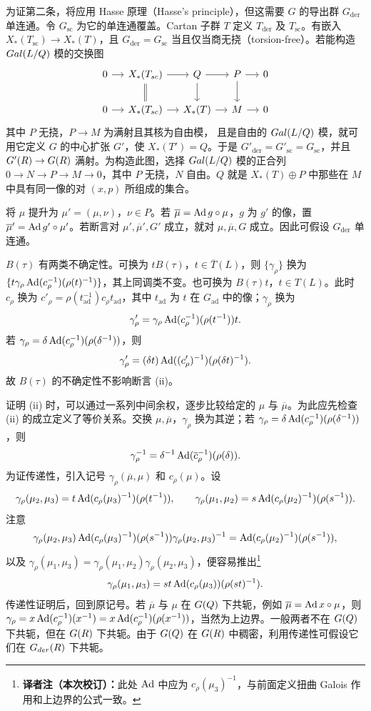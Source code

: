 为证第二条，将应用 Hasse 原理（Hasse's principle），但这需要 $G$ 的导出群
$G_{\mathrm{der}}$ 单连通。令 $G_{\mathrm{sc}}$ 为它的单连通覆盖。Cartan 子群 $T$ 定义
$T_{\mathrm{der}}$ 及 $T_{\mathrm{sc}}$。有嵌入
$X_*(T_{\mathrm{sc}})\to X_*(T)$，且
$G_{\mathrm{der}}=G_{\mathrm{sc}}$ 当且仅当商无挠（torsion-free）。若能构造
$Gal(L/Q)$ 模的交换图
\[
\begin{tikzcd}[column sep=small]
0\arrow[r]&X_*(T_{\mathrm{sc}})\arrow[r]\arrow[d,equal]&Q\arrow[r]\arrow[d]&P\arrow[r]\arrow[d]&0\\
0\arrow[r]&X_*(T_{\mathrm{sc}})\arrow[r]&X_*(T)\arrow[r]&M\arrow[r]&0
\end{tikzcd}
\]
其中 $P$ 无挠，$P\to M$ 为满射且其核为自由模，
且是自由的 $Gal(L/Q)$ 模，就可用它定义 $G$ 的中心扩张 $G'$，使
$X_*(T')=Q$。于是 $G'_{\mathrm{der}}=G'_{\mathrm{sc}}=G_{\mathrm{sc}}$，并且
$G'(R)\to G(R)$ 满射。为构造此图，选择 $Gal(L/Q)$ 模的正合列
$0\to N\to P\to M\to0$，其中 $P$ 无挠，$N$ 自由。$Q$ 就是
$X_*(T)\oplus P$ 中那些在 $M$ 中具有同一像的对 $(x,p)$ 所组成的集合。

将 $\mu$ 提升为 $\mu'=(\mu,\nu)$，$\nu\in P$。若
$\overline\mu=\operatorname{Ad} g\circ\mu$，$g$ 为 $g'$ 的像，置
$\overline\mu'=\operatorname{Ad} g'\circ\mu'$。若断言对
$\mu',\overline\mu',G'$ 成立，就对 $\mu,\overline\mu,G$ 成立。因此可假设
$G_{\mathrm{der}}$ 单连通。

$B(\tau)$ 有两类不确定性。可换为 $tB(\tau)$，$t\in\overline T(L)$，则
$\{\gamma_\rho\}$ 换为
$\{t\gamma_\rho\operatorname{Ad}(c_\rho^{-1})(\rho(t)^{-1})\}$，其上同调类不变。也可换为
$B(\tau)t$，$t\in T(L)$。此时 $c_\rho$ 换为
$c'_\rho=\rho(t_{\mathrm{ad}}^{-1})c_\rho t_{\mathrm{ad}}$，其中
$t_{\mathrm{ad}}$ 为 $t$ 在 $G_{\mathrm{ad}}$ 中的像；$\gamma_\rho$ 换为
\[
\gamma'_\rho=\gamma_\rho\operatorname{Ad}(c_\rho^{-1})(\rho(t^{-1}))t.
\]
若 $\gamma_\rho=\delta\operatorname{Ad}(c_\rho^{-1})(\rho(\delta^{-1}))$，则
\[
\gamma'_\rho=(\delta t)\operatorname{Ad}((c'_\rho)^{-1})(\rho(\delta t)^{-1}).
\]
故 $B(\tau)$ 的不确定性不影响断言 (ii)。

证明 (ii) 时，可以通过一系列中间余权，逐步比较给定的 $\mu$ 与 $\overline\mu$。为此应先检查
(ii) 的成立定义了等价关系。交换 $\mu,\overline\mu$，$\gamma_\rho$ 换为其逆；若
$\gamma_\rho=\delta\operatorname{Ad}(c_\rho^{-1})(\rho(\delta^{-1}))$，则
\[
\gamma_\rho^{-1}=\delta^{-1}\operatorname{Ad}(\overline c_\rho^{-1})(\rho(\delta)).
\]
为证传递性，引入记号 $\gamma_\rho(\overline\mu,\mu)$ 和 $c_\rho(\mu)$。设
\[
\gamma_\rho(\mu_2,\mu_3)=t\operatorname{Ad}(c_\rho(\mu_3)^{-1})(\rho(t^{-1})),
\qquad
\gamma_\rho(\mu_1,\mu_2)=s\operatorname{Ad}(c_\rho(\mu_2)^{-1})(\rho(s^{-1})).
\]
注意
\[
\gamma_\rho(\mu_2,\mu_3)\operatorname{Ad}(c_\rho(\mu_3)^{-1})(\rho(s^{-1}))
\gamma_\rho(\mu_2,\mu_3)^{-1}
=\operatorname{Ad}(c_\rho(\mu_2)^{-1})(\rho(s^{-1})),
\]
以及 $\gamma_\rho(\mu_1,\mu_3)=\gamma_\rho(\mu_1,\mu_2)\gamma_\rho(\mu_2,\mu_3)$，便容易推出\footnote{\textbf{译者注（本次校订）：}此处 $\operatorname{Ad}$ 中应为 $c_\rho(\mu_3)^{-1}$，与前面定义扭曲 Galois 作用和上边界的公式一致。}
\[
\gamma_\rho(\mu_1,\mu_3)=st\operatorname{Ad}(c_\rho(\mu_3))(\rho(st)^{-1}).
\]
传递性证明后，回到原记号。若 $\overline\mu$ 与 $\mu$ 在 $G(Q)$ 下共轭，例如
$\overline\mu=\operatorname{Ad} x\circ\mu$，则
$\gamma_\rho=x\operatorname{Ad}(c_\rho^{-1})(x^{-1})
=x\operatorname{Ad}(c_\rho^{-1})(\rho(x^{-1}))$，当然为上边界。一般两者不在 $G(Q)$ 下共轭，但在
$G(R)$ 下共轭。由于 $G(Q)$ 在 $G(R)$ 中稠密，利用传递性可假设它们在
$G_{der}(R)$ 下共轭。

